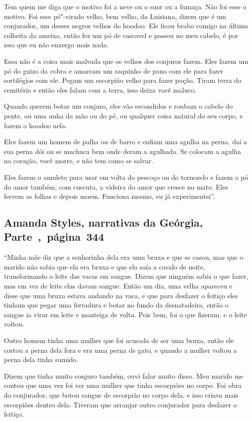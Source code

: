 Tem quem me diga que o motivo foi a neve ou o suor ou a fumaça. Não foi
esse o motivo. Foi esse pé"-virado velho, bem velho, da Luisiana, dizem
que é um conjurador, um desses negros velhos do hoodoo. Ele ficou brabo
comigo na última colheita da ameixa, então fez um pó de cascavel e
passou no meu cabelo, é por isso que eu não enxergo mais nada.

Essa não é a coisa mais malvada que os velhos dos conjuros fazem. Eles
fazem um pó do guizo da cobra e amarram um saquinho de pano com ele para
fazer sortilégios com ele. Pegam um escorpião velho para fazer poção.
Tiram terra do cemitério e então eles falam com a terra, isso deixa você
maluco.

Quando querem botar um conjuro, eles vão escondidos e roubam o cabelo do
pente, ou uma unha da mão ou do pé, ou qualquer coisa natural do seu
corpo, e fazem o hoodoo nela.

Eles fazem um homem de palha ou de barro e enfiam uma agulha na perna,
daí a sua perna dói ou se machuca bem onde deram a agulhada. Se colocam
a agulha no coração, você morre, e não tem como se salvar.

Eles fazem o amuleto para usar em volta do pescoço ou do tornozelo e
fazem o pó do amor também, com cuscuta, a videira do amor que cresce no
mato. Eles fervem as folhas e depois moem. Funciona mesmo, eu já
experimentei''.

\subsection{Amanda Styles, narrativas da Geórgia, Parte~,~página~344}
\label{ref260}

``Minha mãe diz que a senhorinha dela era uma bruxa e que se casou, mas
que o marido não sabia que ela era bruxa e que ela saía a cavalo de
noite, transformando o leite das vacas em sangue. Dizem que ninguém
sabia o que fazer, mas em vez de leite elas davam sangue. Então um dia,
uma velha apareceu e disse que uma bruxa estava andando na vaca, e que
para desfazer o feitiço eles tinham que pegar uma ferradura e botar no
fundo da desnatadeira, então o sangue ia virar em leite e manteiga de
volta. Pois bem, foi o que fizeram, e o leite voltou.

Outro homem tinha uma mulher que foi acusada de ser uma bruxa, então ele
cortou a perna dela fora e era uma perna de gato, e quando a mulher
voltou a perna dela tinha sumido.

Dizem que tinha muito conjuro também, ouvi falar muito disso. Meu marido
me contou que uma vez foi ver uma mulher que tinha escorpiões no corpo.
Foi obra do conjurador, que botou sangue de escorpião no corpo dela, e
isso criava mais escorpiões dentro dela. Tiveram que arranjar outro
conjurador para desfazer o feitiço.


